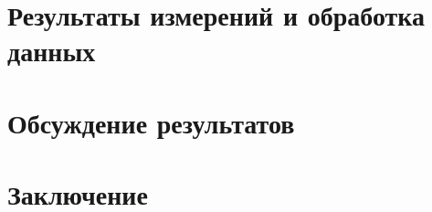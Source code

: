 \documentclass[1 pt]{article}
\begin{document}
\section{Результаты измерений и обработка данных}
\begin{center}
    
\end{center}
\begin{center}
    
\end{center}
\begin{center}
    
\end{center}
\begin{center}
    
\end{center}
\begin{center}
    
\end{center}
\section{Обсуждение результатов}
\section{Заключение}
\end{document}
